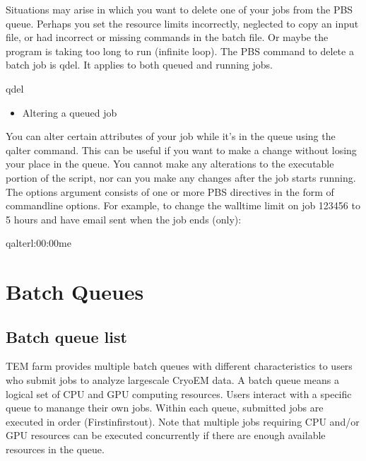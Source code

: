 \documentclass[a4paper,11pt,english]{sphinxmanual}
\begin{document}
\sphinxAtStartPar
Situations may arise in which you want to delete one of your jobs from the PBS queue. Perhaps you set the resource limits incorrectly, neglected to copy an input file, or had incorrect or missing commands in the batch file. Or maybe the program is taking too long to run (infinite loop). The PBS command to delete a batch job is qdel. It applies to both queued and running jobs.

\begin{sphinxVerbatim}[commandchars=\\\{\}]
\PYGZdl{}\PYGZgt{}qdel
\end{sphinxVerbatim}
\begin{itemize}
\item {} 
\sphinxAtStartPar
Altering a queued job

\end{itemize}

\sphinxAtStartPar
You can alter certain attributes of your job while it’s in the queue using the qalter command. This can be useful if you want to make a change without losing your place in the queue. You cannot make any alterations to the executable portion of the script, nor can you make any changes after the job starts running.
The options argument consists of one or more PBS directives in the form of command\sphinxhyphen{}line options. For example, to change the walltime limit on job 123456 to 5 hours and have email sent when the job ends (only):

\begin{sphinxVerbatim}[commandchars=\\\{\}]
\PYGZdl{}\PYGZgt{}qalter\PYGZhy{}l:00:00\PYGZhy{}me
\end{sphinxVerbatim}

\sphinxstepscope


\chapter{Batch Queues}
\label{\detokenize{queue:batch-queues}}\label{\detokenize{queue::doc}}

\section{Batch queue list}
\label{\detokenize{queue:batch-queue-list}}
\sphinxAtStartPar
TEM farm provides multiple batch queues with different characteristics to users who submit jobs to analyze large\sphinxhyphen{}scale Cryo\sphinxhyphen{}EM data.
A batch queue means a logical set of CPU and GPU computing resources.
Users interact with a specific queue to manange their own jobs.
Within each queue, submitted jobs are executed in order (First\sphinxhyphen{}in\sphinxhyphen{}first\sphinxhyphen{}out).
Note that multiple jobs requiring CPU and/or GPU resources can be executed concurrently if there are enough available resources in the queue.
\end{document}
